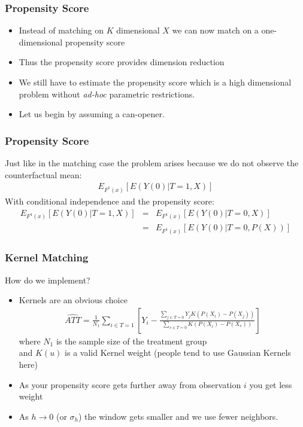 \documentclass[xcolor=pdftex,dvipsnames,table,mathserif]{beamer}
\begin{document}
\begin{frame}
\frametitle{Propensity Score}
\begin{itemize}
\item Instead of matching on $K$ dimensional $X$ we can now match on a one-dimensional propensity score
\item Thus the propensity score provides \alert{dimension reduction}
\item We still have to estimate the propensity score which is a high dimensional problem without \textit{ad-hoc} parametric restrictions.
\item Let us begin by assuming a can-opener.
\end{itemize}
\end{frame}


\begin{frame}
\frametitle{Propensity Score}
Just like in the matching case the problem arises because we do not observe the counterfactual mean:
\begin{eqnarray*}
 E_{F^1(x)} [E(Y(0) | T=1,X)] 
\end{eqnarray*}
With conditional independence and the propensity score:
\begin{eqnarray*}
 E_{F^1(x)} [E(Y(0) | T=1,X)]  &=&  E_{F^1(x)} [E(Y(0) | T=0,X)] \\
 &=&  E_{F^1(x)} [E(Y(0) | T=0,P(X))] 
\end{eqnarray*}
\end{frame}

\begin{frame}
\frametitle{Kernel Matching}
How do we implement?
\begin{itemize}
\item Kernels are an obvious choice
\begin{eqnarray*}
\widehat{ATT} = \frac{1}{N_1} \sum_{i \in T=1} \left[Y_i - \frac{\sum_{j \in T=0} Y_j K\left(P(X_i) - P(X_j) \right) }{\sum_{s \in T=0}  K\left(P(X_i) - P(X_s) \right)}   \right]
\end{eqnarray*}
 where $N_1$ is the sample size of the treatment group \\
 and $K(u)$ is a valid Kernel weight (people tend to use Gaussian Kernels here)
\item As your propensity score gets further away from observation $i$ you get less weight
\item As $h \rightarrow 0$  (or $\sigma_h$) the window gets smaller and we use fewer neighbors.
\end{itemize}
\end{frame}
\end{document}
